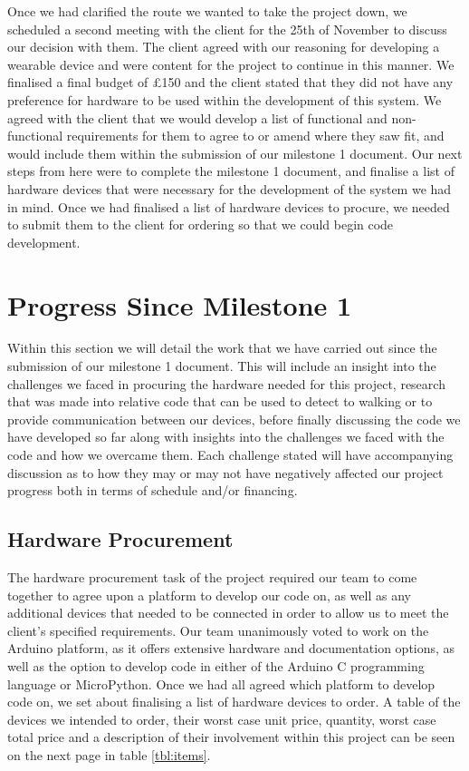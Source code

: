 \documentclass[12pt, a4paper]{report}
\begin{document}
Once we had clarified the route we wanted to take the project down, we scheduled a second meeting with the client for the 25th of November to discuss our decision with them. The client agreed with our reasoning for developing a wearable device and were content for the project to continue in this manner. We finalised a final budget of £150 and the client stated that they did not have any preference for hardware to be used within the development of this system. We agreed with the client that we would develop a list of functional and non-functional requirements for them to agree to or amend where they saw fit, and would include them within the submission of our milestone 1 document. Our next steps from here were to complete the milestone 1 document, and finalise a list of hardware devices that were necessary for the development of the system we had in mind. Once we had finalised a list of hardware devices to procure, we needed to submit them to the client for ordering so that we could begin code development.

\section{Progress Since Milestone 1}

Within this section we will detail the work that we have carried out since the submission of our milestone 1 document. This will include an insight into the challenges we faced in procuring the hardware needed for this project, research that was made into relative code that can be used to detect to walking or to provide communication between our devices, before finally discussing the code we have developed so far along with insights into the challenges we faced with the code and how we overcame them. Each challenge stated will have accompanying discussion as to how they may or may not have negatively affected our project progress both in terms of schedule and/or financing.

\subsection{Hardware Procurement}

The hardware procurement task of the project required our team to come together to agree upon a platform to develop our code on, as well as any additional devices that needed to be connected in order to allow us to meet the client's specified requirements. Our team unanimously voted to work on the Arduino platform, as it offers extensive hardware and documentation options, as well as the option to develop code in either of the Arduino C programming language or MicroPython. Once we had all agreed which platform to develop code on, we set about finalising a list of hardware devices to order. A table of the devices we intended to order, their worst case unit price, quantity, worst case total price and a description of their involvement within this project can be seen on the next page in table \ref{tbl:items}.
\end{document}
